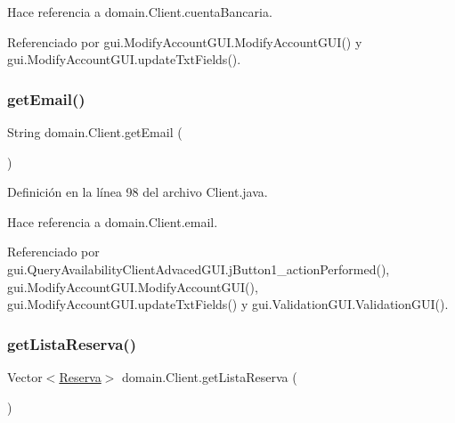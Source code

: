 Hace referencia a domain.\+Client.\+cuenta\+Bancaria.



Referenciado por gui.\+Modify\+Account\+G\+U\+I.\+Modify\+Account\+G\+U\+I() y gui.\+Modify\+Account\+G\+U\+I.\+update\+Txt\+Fields().

\mbox{\label{classdomain_1_1_client_afd3ba7dd00443e3ec17de99f43b27a58}} 
\subsubsection{\texorpdfstring{getEmail()}{getEmail()}}
{\footnotesize\ttfamily String domain.\+Client.\+get\+Email (\begin{DoxyParamCaption}{ }\end{DoxyParamCaption})}



Definición en la línea 98 del archivo Client.\+java.


\begin{DoxyCode}{0}

\end{DoxyCode}


Hace referencia a domain.\+Client.\+email.



Referenciado por gui.\+Query\+Availability\+Client\+Advaced\+G\+U\+I.\+j\+Button1\+\_\+action\+Performed(), gui.\+Modify\+Account\+G\+U\+I.\+Modify\+Account\+G\+U\+I(), gui.\+Modify\+Account\+G\+U\+I.\+update\+Txt\+Fields() y gui.\+Validation\+G\+U\+I.\+Validation\+G\+U\+I().

\mbox{\label{classdomain_1_1_client_ac8b0f7513cd299b00a0e8cb44a70e3c4}} 
\subsubsection{\texorpdfstring{getListaReserva()}{getListaReserva()}}
{\footnotesize\ttfamily Vector$<$\mbox{\hyperlink{classdomain_1_1_reserva}{Reserva}}$>$ domain.\+Client.\+get\+Lista\+Reserva (\begin{DoxyParamCaption}{ }\end{DoxyParamCaption})}



